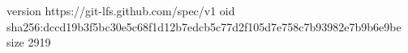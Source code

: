 version https://git-lfs.github.com/spec/v1
oid sha256:dccd19b3f5bc30e5c68f1d12b7edcb5c77d2f105d7e758c7b93982e7b9b6e9be
size 2919

